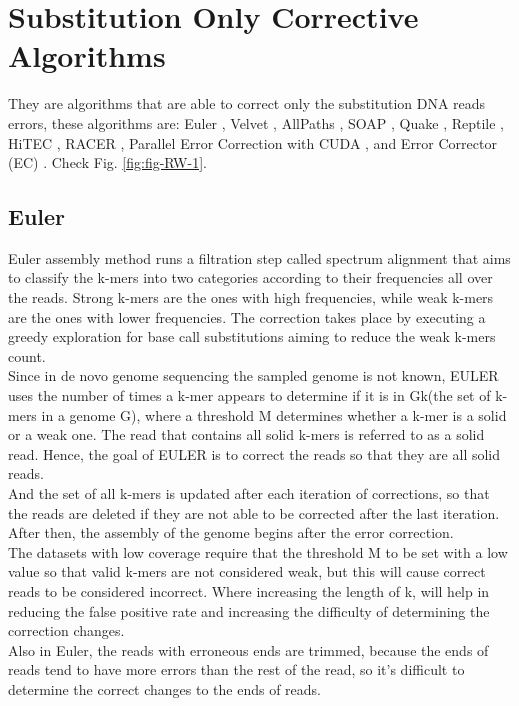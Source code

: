 \documentclass[12pt,openany]{llncs}
\begin{document}
\section{Substitution Only Corrective Algorithms}
They are algorithms that are able to correct only the substitution DNA reads errors, these algorithms are: Euler \cite{Euler}, Velvet \cite{Velvet}, AllPaths \cite{AllPaths}, SOAP \cite{Soap}, Quake \cite{Quake}, Reptile \cite{Reptile}, HiTEC \cite{HiTec}, RACER \cite{Racer}, Parallel Error Correction with CUDA \cite{Cuda}, and Error Corrector (EC) \cite{EC}. Check Fig. \ref{fig:fig-RW-1}.
\subsection{Euler}
Euler \cite{Euler} assembly method runs a filtration step called spectrum alignment that aims to classify the k-mers into two categories according to their frequencies all over the reads. Strong k-mers are the ones with high frequencies, while weak k-mers are the ones with lower frequencies. The correction takes place by executing a greedy exploration for base call substitutions aiming to reduce the weak k-mers count.
\\
Since in de novo genome sequencing the sampled genome is not known, EULER uses the number of times a k-mer appears to determine if it is in Gk(the set of k-mers in a genome G), where a threshold M determines whether a k-mer is a solid or a weak one. The read that contains all solid k-mers is referred to as a solid read. Hence, the goal of EULER is to correct the reads so that they are all solid reads.
\\
And the set of all k-mers is updated after each iteration of corrections, so that the reads are deleted if they are not able to be corrected after the last iteration. After then, the assembly of the genome begins after the error correction.
\\
The datasets with low coverage require that the threshold M to be set with a low value so that valid k-mers are not considered weak, but this will cause correct reads to be considered incorrect. 
Where increasing the length of k, will help in reducing the false positive rate and increasing the difficulty of determining the correction changes.
\\
Also in Euler, the reads with erroneous ends are trimmed, because the ends of reads tend to have more errors than the rest of the read, so it's difficult to determine the correct changes to the ends of reads.
\end{document}
